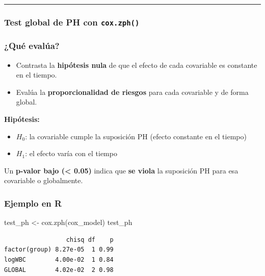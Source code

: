 \documentclass[
]{article}
\newenvironment{Shaded}{\begin{snugshade}}{\end{snugshade}}
\newcommand{\FunctionTok}[1]{\textcolor[rgb]{0.28,0.35,0.67}{#1}}
\newcommand{\NormalTok}[1]{\textcolor[rgb]{0.00,0.23,0.31}{#1}}
\newcommand{\OtherTok}[1]{\textcolor[rgb]{0.00,0.23,0.31}{#1}}
\providecommand{\tightlist}{%
  \setlength{\itemsep}{0pt}\setlength{\parskip}{0pt}}\usepackage{longtable,booktabs,array}
\begin{document}
\begin{center}\rule{0.5\linewidth}{0.5pt}\end{center}

\subsubsection{\texorpdfstring{Test global de PH con
\texttt{cox.zph()}}{Test global de PH con cox.zph()}}\label{test-global-de-ph-con-cox.zph}

\subsubsection{¿Qué evalúa?}\label{quuxe9-evaluxfaa}

\begin{itemize}
\tightlist
\item
  Contrasta la \textbf{hipótesis nula} de que el efecto de cada
  covariable es constante en el tiempo.
\item
  Evalúa la \textbf{proporcionalidad de riesgos} para cada covariable y
  de forma global.
\end{itemize}

\textbf{Hipótesis:}

\begin{itemize}
\tightlist
\item
  \(H_0\): la covariable cumple la suposición PH (efecto constante en el
  tiempo)
\item
  \(H_1\): el efecto varía con el tiempo
\end{itemize}

Un \textbf{p-valor bajo (\textless{} 0.05)} indica que \textbf{se viola}
la suposición PH para esa covariable o globalmente.

\subsubsection{Ejemplo en R}\label{ejemplo-en-r}

\begin{Shaded}
\begin{Highlighting}[]
\NormalTok{test\_ph }\OtherTok{\textless{}{-}} \FunctionTok{cox.zph}\NormalTok{(cox\_model)}
\NormalTok{test\_ph}
\end{Highlighting}
\end{Shaded}

\begin{verbatim}
                 chisq df    p
factor(group) 8.27e-05  1 0.99
logWBC        4.00e-02  1 0.84
GLOBAL        4.02e-02  2 0.98
\end{verbatim}
\end{document}

